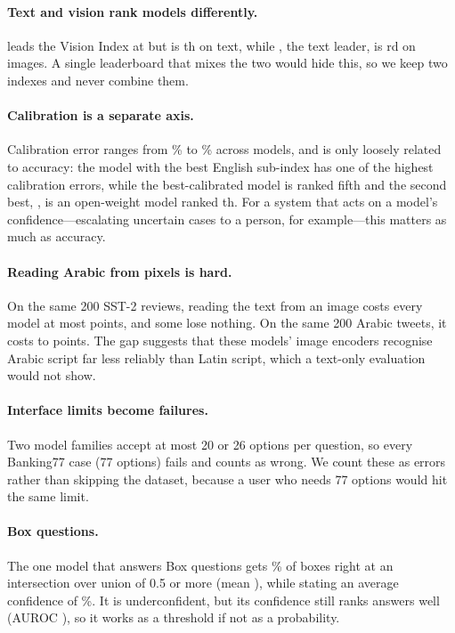 \documentclass[11pt]{article}
\begin{document}
\paragraph{Text and vision rank models differently.} \topVision{} leads the Vision Index at \topVisionIdx{} but is
\topVisionTextRank{}th on text, while \topText{}, the text leader, is \topTextVisionRank{}rd on images. A single
leaderboard that mixes the two would hide this, so we keep two indexes and never combine them.

\paragraph{Calibration is a separate axis.} Calibration error ranges from \eceMin{}\% to \eceMax{}\% across models,
and is only loosely related to accuracy: the model with the best English sub-index has one of the highest
calibration errors, while the best-calibrated model is ranked fifth and the second best, \eceSecond{}, is an open-weight model
ranked \eceSecondRank{}th. For a system that acts on a model's
confidence---escalating uncertain cases to a person, for example---this matters as much as accuracy.

\paragraph{Reading Arabic from pixels is hard.} On the same 200 SST-2 reviews, reading the text from an image costs
every model at most \enGapWorst{} points, and some lose nothing. On the same 200 Arabic tweets, it costs \arGapBest{}
to \arGapWorst{} points. The gap suggests that these models' image encoders recognise Arabic script far less
reliably than Latin script, which a text-only evaluation would not show.

\paragraph{Interface limits become failures.} Two model families accept at most 20 or 26 options per question, so
every Banking77 case (77 options) fails and counts as wrong. We count these as errors rather than skipping the
dataset, because a user who needs 77 options would hit the same limit.

\paragraph{Box questions.} The one model that answers Box questions gets \boxRight{}\% of boxes right at an
intersection over union of 0.5 or more (mean \boxIou{}), while stating an average confidence of \boxConf{}\%. It is
underconfident, but its confidence still ranks answers well (AUROC \boxAuroc{}), so it works as a threshold if not as a
probability.
\end{document}
